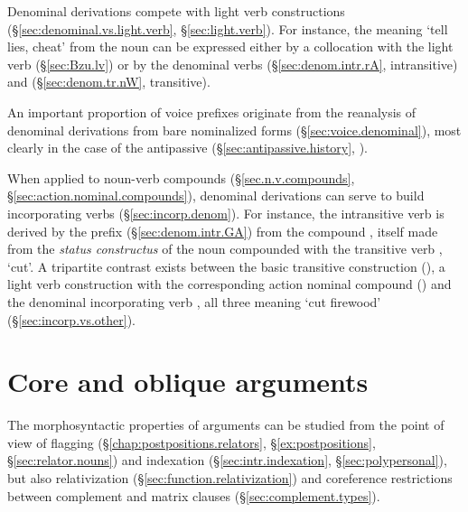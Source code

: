 Denominal derivations compete with light verb constructions (§\ref{sec:denominal.vs.light.verb}, §\ref{sec:light.verb}). For instance, the meaning `tell lies, cheat' from the noun  can be expressed either by a collocation with the light verb  (§\ref{sec:Bzu.lv}) or by the denominal verbs  (§\ref{sec:denom.intr.rA}, intransitive) and  (§\ref{sec:denom.tr.nW}, transitive).

An important proportion of voice prefixes originate from the reanalysis of denominal derivations from bare nominalized forms (§\ref{sec:voice.denominal}), most clearly in the case of the  antipassive (§\ref{sec:antipassive.history}, \citealt{jacques14antipassive}).

When applied to noun-verb compounds (§\ref{sec.n.v.compounds}, §\ref{sec:action.nominal.compounds}), denominal derivations can serve to build incorporating verbs (§\ref{sec:incorp.denom}). For instance, the intransitive verb  is derived by the prefix  (§\ref{sec:denom.intr.GA}) from the compound , itself made from the \textit{status constructus}  of the noun  compounded with the transitive verb , `cut'. A tripartite contrast exists between the basic transitive construction (), a light verb construction with the corresponding action nominal compound () and the denominal incorporating verb , all three meaning `cut firewood' (§\ref{sec:incorp.vs.other}).


 \section{Core and oblique arguments } \label{sec:alignment.introduction}
The morphosyntactic properties of arguments can be studied from the point of view of flagging (§\ref{chap:postpositions.relators}, §\ref{ex:postpositions}, §\ref{sec:relator.nouns}) and indexation (§\ref{sec:intr.indexation}, §\ref{sec:polypersonal}), but also relativization (§\ref{sec:function.relativization}) and coreference restrictions between complement and matrix clauses (§\ref{sec:complement.types}).
 
